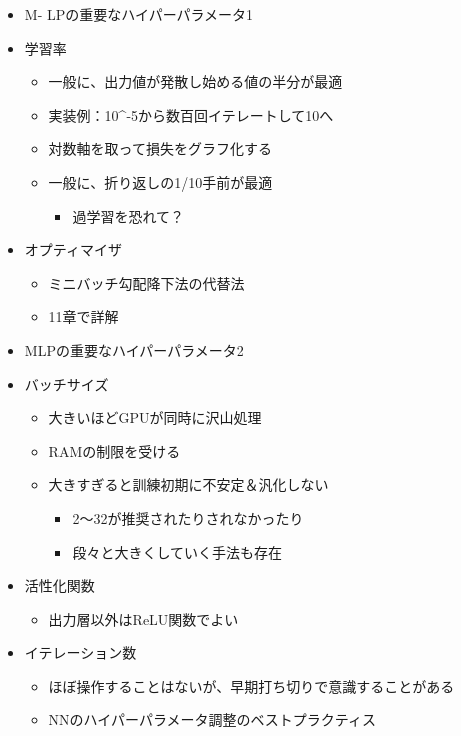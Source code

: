 \begin{itemize}
\tightlist
\item
  M- LPの重要なハイパーパラメータ1
\item
  学習率

  \begin{itemize}
  \tightlist
  \item
    一般に、出力値が発散し始める値の半分が最適
  \item
    実装例：10\^{}-5から数百回イテレートして10へ
  \item
    対数軸を取って損失をグラフ化する
  \item
    一般に、折り返しの1/10手前が最適

    \begin{itemize}
    \tightlist
    \item
      過学習を恐れて？
    \end{itemize}
  \end{itemize}
\item
  オプティマイザ

  \begin{itemize}
  \tightlist
  \item
    ミニバッチ勾配降下法の代替法
  \item
    11章で詳解
  \end{itemize}
\item
  MLPの重要なハイパーパラメータ2
\item
  バッチサイズ

  \begin{itemize}
  \tightlist
  \item
    大きいほどGPUが同時に沢山処理
  \item
    RAMの制限を受ける
  \item
    大きすぎると訓練初期に不安定＆汎化しない

    \begin{itemize}
    \tightlist
    \item
      2～32が推奨されたりされなかったり
    \item
      段々と大きくしていく手法も存在
    \end{itemize}
  \end{itemize}
\item
  活性化関数

  \begin{itemize}
  \tightlist
  \item
    出力層以外はReLU関数でよい
  \end{itemize}
\item
  イテレーション数

  \begin{itemize}
  \tightlist
  \item
    ほぼ操作することはないが、早期打ち切りで意識することがある
  \item
    NNのハイパーパラメータ調整のベストプラクティス
  \end{itemize}
\end{itemize}
